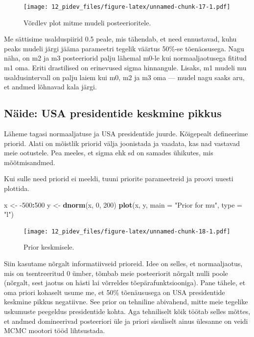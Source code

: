 \documentclass[]{book}
\newenvironment{Shaded}{\begin{snugshade}}{\end{snugshade}}
\newcommand{\DataTypeTok}[1]{\textcolor[rgb]{0.13,0.29,0.53}{#1}}
\newcommand{\DecValTok}[1]{\textcolor[rgb]{0.00,0.00,0.81}{#1}}
\newcommand{\KeywordTok}[1]{\textcolor[rgb]{0.13,0.29,0.53}{\textbf{#1}}}
\newcommand{\NormalTok}[1]{#1}
\newcommand{\OperatorTok}[1]{\textcolor[rgb]{0.81,0.36,0.00}{\textbf{#1}}}
\newcommand{\StringTok}[1]{\textcolor[rgb]{0.31,0.60,0.02}{#1}}
\begin{document}
\begin{figure}
\centering
\texttt{[image: 12\_pidev\_files/figure-latex/unnamed-chunk-17-1.pdf]}
\caption{\label{fig:unnamed-chunk-17}Võrdlev plot mitme mudeli posteerioritele.}
\end{figure}

Me sättisime usalduspiirid 0.5 peale, mis tähendab, et need ennustavad, kuhu peaks mudeli järgi jääma parameetri tegelik väärtus 50\%-se tõenäosusega.
Nagu näha, on m2 ja m3 posteeriorid palju lähemal m0-le kui normaaljaotusega fititud m1 oma.
Eriti drastilised on erinevused sigma hinnangule.
Lisaks, m1 mudeli mu usaldusintervall on palju laiem kui m0, m2 ja m3 oma --- mudel nagu saaks aru, et andmed lõhnavad kala järgi.

\hypertarget{naide-usa-presidentide-keskmine-pikkus}{%
\subsection*{Näide: USA presidentide keskmine pikkus}\label{naide-usa-presidentide-keskmine-pikkus}}

Läheme tagasi normaaljatuse ja USA presidentide juurde.
Kõigepealt defineerime priorid.
Alati on mõistlik priorid välja joonistada ja vaadata, kas nad vastavad meie ootustele.
Pea meeles, et sigma ehk sd on samades ühikutes, mis mõõtmisandmed.

Kui sulle need priorid ei meeldi, tuuni priorite parameetreid ja proovi uuesti plottida.

\begin{Shaded}
\begin{Highlighting}[]
\NormalTok{x <-}\StringTok{ }\DecValTok{-500}\OperatorTok{:}\DecValTok{500}
\NormalTok{y <-}\StringTok{ }\KeywordTok{dnorm}\NormalTok{(x, }\DecValTok{0}\NormalTok{, }\DecValTok{200}\NormalTok{)}
\KeywordTok{plot}\NormalTok{(x, y, }\DataTypeTok{main =} \StringTok{"Prior for mu"}\NormalTok{, }\DataTypeTok{type =} \StringTok{"l"}\NormalTok{)}
\end{Highlighting}
\end{Shaded}

\begin{figure}
\centering
\texttt{[image: 12\_pidev\_files/figure-latex/unnamed-chunk-18-1.pdf]}
\caption{\label{fig:unnamed-chunk-18}Prior keskmisele.}
\end{figure}

Siin kasutame nõrgalt informatiivseid prioreid.
Idee on selles, et normaaljaotus, mis on tsentreeritud 0 ümber, tõmbab meie posteeriorit nõrgalt nulli poole (nõrgalt, sest jaotus on hästi lai võrreldes tõepärafunktsiooniga).
Pane tähele, et oma priori kohaselt usume me, et 50\% tõenäususega on USA presidentide keskmine pikkus negatiivne.
See prior on tehniline abivahend, mitte meie tegelike uskumuste peegeldus presidentide kohta.
Aga tehniliselt kõik töötab selles mõttes, et andmed domineerivad posteeriori üle ja priori sisuliselt ainus ülesanne on veidi MCMC mootori tööd lihtsustada.
\end{document}
